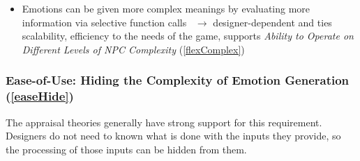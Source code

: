 \begin{itemize}
\begin{itemize}
        \item Emotions can be given more complex meanings by evaluating more
        information via selective function
        calls~\citep[p.~32--34]{oatley1987towards} $\rightarrow$
        designer-dependent and ties scalability, efficiency to the needs of the
        game, supports \textit{Ability to Operate on Different Levels of NPC
            Complexity} (\ref{flexComplex})
    \end{itemize}
\end{itemize}

\subsubsection{Ease-of-Use: Hiding the Complexity of Emotion Generation
    (\ref{easeHide})}
The appraisal theories generally have strong support for this requirement.
Designers do not need to known what is done with the inputs they provide, so
the processing of those inputs can be hidden from them.

